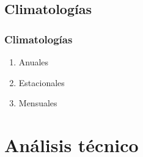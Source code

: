 \documentclass{beamer}
\newtheorem{Th2}{Definición}
\begin{document}
	\subsection{Climatologías}
	\begin{frame}
		\frametitle{Climatologías}
		\begin{enumerate}[<+(1) | invisible@-+>]
			\item Anuales
			\item Estacionales
			\item Mensuales
		\end{enumerate}
	\end{frame} 



	\section{Análisis técnico}
\end{document}
